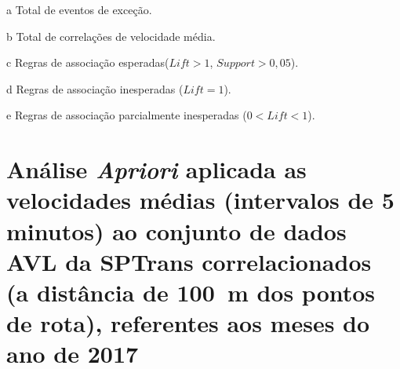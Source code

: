 \documentclass[
	12pt,				%
	oneside,			%
	a4paper,			%
	english,			%
	brazil				%
	]{abntex2ppgsi}
\begin{document}
{{\begin{apendicesenv}
\begin{table}[!htb]
\begin{threeparttable}
\begin{tablenotes}
            \item[a] Total de eventos de exceção.
            \item[b] Total de correlações de velocidade média.
            \item[c] Regras de associação esperadas($Lift > 1$, $Support > 0,05$).
            \item[d] Regras de associação inesperadas ($Lift = 1$).
            \item[e] Regras de associação parcialmente inesperadas ($0 < Lift < 1$).
        \end{tablenotes}
\end{threeparttable}
\end{table}

\clearpage

\section{Análise \textit{Apriori} aplicada as velocidades médias (intervalos de 5 minutos) ao conjunto de dados AVL da SPTrans correlacionados (a distância de 100~m dos pontos de rota), referentes aos meses do ano de 2017}
\label{g5}


\end{apendicesenv}}}
\end{document}
